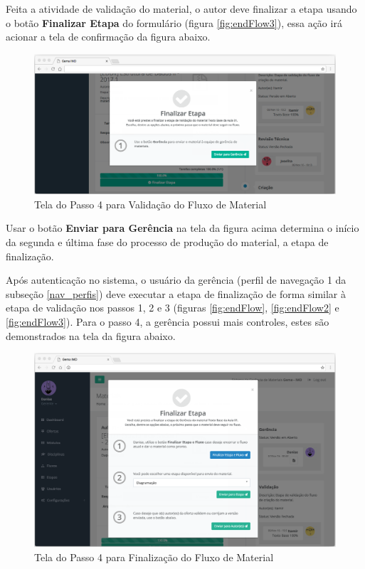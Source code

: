 Feita a atividade de validação do material, o autor deve finalizar a etapa usando o botão \textbf{Finalizar Etapa} do formulário (figura \hyperref[fig:endFlow3]{\ref{fig:endFlow3}}), essa ação irá acionar a tela de confirmação da figura abaixo.

\begin{figure}[H]
\centering
     \includegraphics[width=1.0\textwidth]{Screens/EndFlow4.png}
      \caption{Tela do Passo 4 para Validação do Fluxo de Material}
       \label{fig:endFlow4}
\end{figure} 

Usar o botão \textbf{Enviar para Gerência} na tela da figura acima determina o início da segunda e última fase do processo de produção do material, a etapa de finalização.

Após autenticação no sistema, o usuário da gerência (perfil de navegação 1 da subseção \hyperref[nav_perfis]{\ref{nav_perfis}}) deve executar a etapa de finalização de forma similar à etapa de validação nos passos 1, 2 e 3 (figuras \hyperref[fig:endFlow]{\ref{fig:endFlow}}, \hyperref[fig:endFlow2]{\ref{fig:endFlow2}} e \hyperref[fig:endFlow3]{\ref{fig:endFlow3}}). Para o passo 4, a gerência possui mais controles, estes são demonstrados na tela da figura abaixo.

\begin{figure}[H]
\centering
     \includegraphics[width=1.0\textwidth]{Screens/EndFlow4Management.png}
      \caption{Tela do Passo 4 para Finalização do Fluxo de Material}
       \label{fig:endFlow5Management}
\end{figure} 

